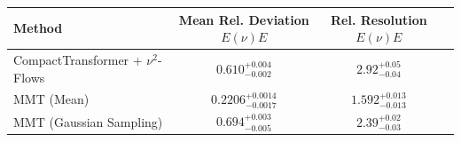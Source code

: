     \begin{tabular}{lccc}
        \toprule
        Method & Mean Rel. Deviation $E(\nu)E$ & Rel. Resolution $E(\nu)E$ \\
        \midrule
        CompactTransformer + $\nu^2$-Flows & $0.610^{+0.004}_{-0.002}$ & $2.92^{+0.05}_{-0.04}$ \\
        MMT (Mean) & $0.2206^{+0.0014}_{-0.0017}$ & $1.592^{+0.013}_{-0.013}$ \\
        MMT (Gaussian Sampling) & $0.694^{+0.003}_{-0.005}$ & $2.39^{+0.02}_{-0.03}$ \\
        \bottomrule
    \end{tabular}